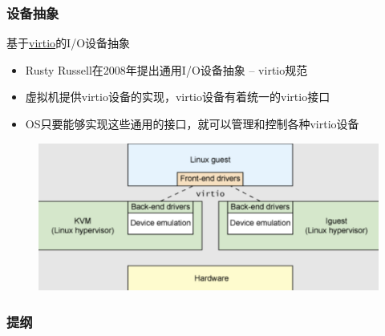 \begin{frame}[fragile]
    \frametitle{设备抽象}
    基于\href{https://developer.ibm.com/technologies/linux/articles/l-virtio/}{virtio}的I/O设备抽象
    \begin{itemize}
        \item Rusty Russell在2008年提出通用I/O设备抽象 – virtio规范
        \item 虚拟机提供virtio设备的实现，virtio设备有着统一的virtio接口
        \item OS只要能够实现这些通用的接口，就可以管理和控制各种virtio设备
    \end{itemize}
    \begin{figure}
        \includegraphics[width=0.6\linewidth]{figs/virtio.png}
    \end{figure}
\end{frame}
\begin{frame}
\frametitle{提纲} %
\tableofcontents %


\end{frame}
